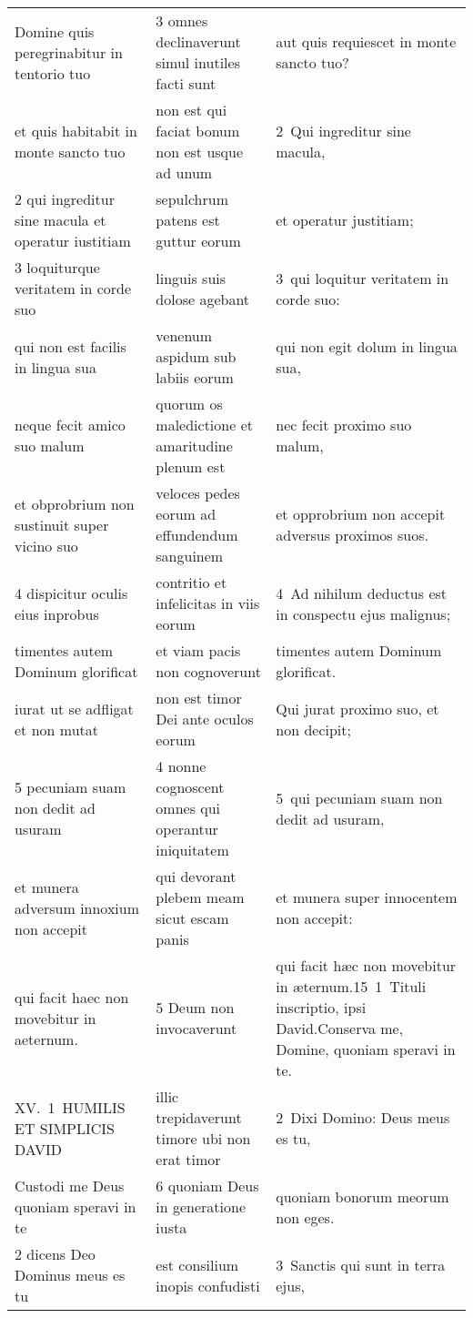 \documentclass{article}
\begin{document}
\begin{longtable}{@{}p{}p{}p{}@{}}
Domine quis peregrinabitur in tentorio tuo	&	3 omnes declinaverunt simul inutiles facti sunt	&	aut quis requiescet in monte sancto tuo?	\\
et quis habitabit in monte sancto tuo	&	non est qui faciat bonum non est usque ad unum	&	2 Qui ingreditur sine macula,	\\
2 qui ingreditur sine macula et operatur iustitiam	&	sepulchrum patens est guttur eorum	&	et operatur justitiam;	\\
3 loquiturque veritatem in corde suo	&	linguis suis dolose agebant	&	3 qui loquitur veritatem in corde suo:	\\
qui non est facilis in lingua sua	&	venenum aspidum sub labiis eorum	&	qui non egit dolum in lingua sua,	\\
neque fecit amico suo malum	&	quorum os maledictione et amaritudine plenum est	&	nec fecit proximo suo malum,	\\
et obprobrium non sustinuit super vicino suo	&	veloces pedes eorum ad effundendum sanguinem	&	et opprobrium non accepit adversus proximos suos.	\\
4 dispicitur oculis eius inprobus	&	contritio et infelicitas in viis eorum	&	4 Ad nihilum deductus est in conspectu ejus malignus;	\\
timentes autem Dominum glorificat	&	et viam pacis non cognoverunt	&	timentes autem Dominum glorificat.	\\
iurat ut se adfligat et non mutat	&	non est timor Dei ante oculos eorum	&	Qui jurat proximo suo, et non decipit;	\\
5 pecuniam suam non dedit ad usuram	&	4 nonne cognoscent omnes qui operantur iniquitatem	&	5 qui pecuniam suam non dedit ad usuram,	\\
et munera adversum innoxium non accepit	&	qui devorant plebem meam sicut escam panis	&	et munera super innocentem non accepit:	\\
qui facit haec non movebitur in aeternum.	&	5 Deum non invocaverunt	&	qui facit hæc non movebitur in æternum.15 1 Tituli inscriptio, ipsi David.Conserva me, Domine, quoniam speravi in te.	\\
XV. 1 HUMILIS ET SIMPLICIS DAVID	&	illic trepidaverunt timore ubi non erat timor	&	2 Dixi Domino: Deus meus es tu,	\\
Custodi me Deus quoniam speravi in te	&	6 quoniam Deus in generatione iusta	&	quoniam bonorum meorum non eges.	\\
2 dicens Deo Dominus meus es tu	&	est consilium inopis confudisti	&	3 Sanctis qui sunt in terra ejus,	\\

\end{longtable}
\end{document}
